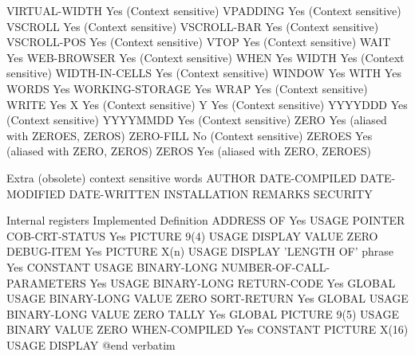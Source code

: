 VIRTUAL-WIDTH                   Yes (Context sensitive)
VPADDING                        Yes (Context sensitive)
VSCROLL                         Yes (Context sensitive)
VSCROLL-BAR                     Yes (Context sensitive)
VSCROLL-POS                     Yes (Context sensitive)
VTOP                            Yes (Context sensitive)
WAIT                            Yes
WEB-BROWSER                     Yes (Context sensitive)
WHEN                            Yes
WIDTH                           Yes (Context sensitive)
WIDTH-IN-CELLS                  Yes (Context sensitive)
WINDOW                          Yes
WITH                            Yes
WORDS                           Yes
WORKING-STORAGE                 Yes
WRAP                            Yes (Context sensitive)
WRITE                           Yes
X                               Yes (Context sensitive)
Y                               Yes (Context sensitive)
YYYYDDD                         Yes (Context sensitive)
YYYYMMDD                        Yes (Context sensitive)
ZERO                            Yes (aliased with ZEROES, ZEROS)
ZERO-FILL                       No (Context sensitive)
ZEROES                          Yes (aliased with ZERO, ZEROS)
ZEROS                           Yes (aliased with ZERO, ZEROES)

Extra (obsolete) context sensitive words
AUTHOR
DATE-COMPILED
DATE-MODIFIED
DATE-WRITTEN
INSTALLATION
REMARKS
SECURITY

Internal registers              Implemented     Definition
ADDRESS OF                      Yes             USAGE POINTER
COB-CRT-STATUS                  Yes             PICTURE 9(4) USAGE DISPLAY VALUE ZERO
DEBUG-ITEM                      Yes             PICTURE X(n) USAGE DISPLAY
'LENGTH OF' phrase              Yes             CONSTANT USAGE BINARY-LONG
NUMBER-OF-CALL-PARAMETERS       Yes             USAGE BINARY-LONG
RETURN-CODE                     Yes             GLOBAL USAGE BINARY-LONG VALUE ZERO
SORT-RETURN                     Yes             GLOBAL USAGE BINARY-LONG VALUE ZERO
TALLY                           Yes             GLOBAL PICTURE 9(5) USAGE BINARY VALUE ZERO
WHEN-COMPILED                   Yes             CONSTANT PICTURE X(16) USAGE DISPLAY
@end verbatim
